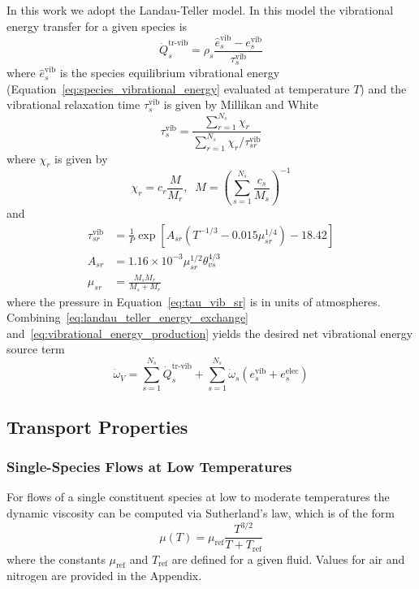 In this work we adopt the Landau-Teller model.  In this model the vibrational energy transfer for a given species is
\begin{equation}
  \label{eq:landau_teller_energy_exchange}
  \dot{Q}^{\text{tr-vib}}_s = \rho_s \frac{\hat{e}^{\text{vib}}_{s} - e^{\text{vib}}_s}{\tau^{\text{vib}}_s}
\end{equation}
where $\hat{e}^{\text{vib}}_{s}$ is the species equilibrium vibrational energy (Equation~\eqref{eq:species_vibrational_energy} evaluated at temperature $T$) and the vibrational relaxation time $\tau^{\text{vib}}_s$ is given by Millikan and White
\begin{equation}
  \tau^{\text{vib}}_s = \frac{\sum_{r=1}^{N_s} \chi_r}{\sum_{r=1}^{N_s} \chi_r/\tau^{\text{vib}}_{sr}}
\end{equation}
where $\chi_r$ is given by
\begin{equation}
  \label{eq:chi_definition}
  \chi_r = c_r\frac{M}{M_r},\;\; M=\left(\sum_{s=1}^{N_s}\frac{c_s}{M_s}\right)^{-1}
\end{equation}
and
\begin{align}
  \label{eq:tau_vib_sr}
  \tau^{\text{vib}}_{sr} &=  \frac{1}{P} \exp\left[A_{sr}\left(T^{-1/3} - 0.015 \mu^{1/4}_{sr}\right) - 18.42\right] \\
          A_{sr} &= 1.16\times 10^{-3} \mu^{1/2}_{sr}\theta_{vs}^{4/3} \\
        \mu_{sr} &= \frac{M_s M_r}{M_s + M_r}
\end{align}
where the pressure in Equation~\eqref{eq:tau_vib_sr} is in units of atmospheres. Combining~\eqref{eq:landau_teller_energy_exchange} and~\eqref{eq:vibrational_energy_production} yields the desired net vibrational energy source term
\begin{equation}
  \dot{\omega}_V = \sum_{s=1}^{N_s} \dot{Q}^{\text{tr-vib}}_s + \sum_{s=1}^{N_s} \dot{\omega}_s\left(e^{\text{vib}}_{s} + e^{\text{elec}}_{s}\right)
\end{equation}


\subsection{Transport Properties}
\subsubsection{Single-Species Flows at Low Temperatures}
For flows of a single constituent species at low to moderate temperatures the dynamic viscosity can be computed via Sutherland's law, which is of the form
\begin{equation}
  \mu\left(T\right) = \mu_{\text{ref}} \frac{T^{3/2}}{T + T_{\text{ref}}}
\end{equation}
where the constants $\mu_{\text{ref}}$ and $T_{\text{ref}}$ are defined for a given fluid.  Values for air and nitrogen are provided in the Appendix.

